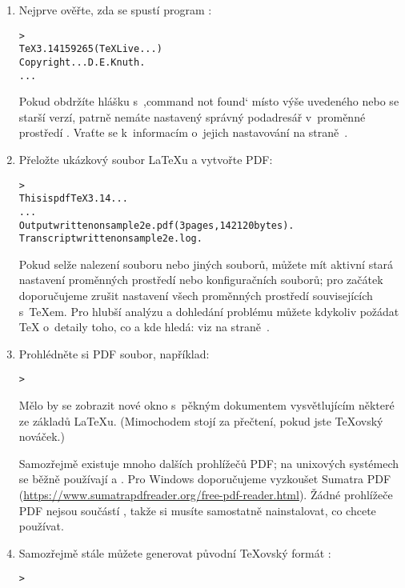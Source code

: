 \documentclass[\classoptions,slovak,english,czech]{\classname}
\newcommand{\singleuv}[1]{,#1`}
\begin{document}
\begin{enumerate}
\item Nejprve ověřte, zda se spustí program :

\begin{alltt}
> 
TeX 3.14159265 (TeX Live ...)
Copyright ... D.E. Knuth.
...
\end{alltt}
Pokud obdržíte hlášku s~\singleuv{command not found} místo výše 
uvedeného nebo se starší verzí, patrně nemáte nastavený správný podadresář
 v~proměnné prostředí .  Vraťte se
k~informacím o~jejich nastavování na straně~\pageref{sec:env}.

\item Přeložte ukázkový soubor \LaTeX{}u a vytvořte PDF:
\begin{alltt}
> 
This is pdfTeX 3.14...
...
Output written on sample2e.pdf (3 pages, 142120 bytes).
Transcript written on sample2e.log.
\end{alltt}
Pokud selže nalezení souboru  nebo jiných
souborů, můžete mít aktivní stará nastavení proměnných prostředí nebo
konfiguračních souborů; pro začátek doporučujeme zrušit 
nastavení všech proměnných prostředí souvisejících s~\TeX{}em.
Pro hlubší analýzu a dohledání problému můžete kdykoliv požádat
\TeX{} o~detaily toho, co a kde hledá: viz 
na straně~\pageref{sec:debugging}.

\item Prohlédněte si PDF soubor, například:
\begin{alltt}
	> 
\end{alltt}
Mělo by se zobrazit nové okno s~pěkným dokumentem vysvětlujícím některé ze
základů \LaTeX{}u. (Mimochodem stojí za přečtení, pokud jste \TeX{}ovský nováček.)

Samozřejmě existuje mnoho dalších prohlížečů PDF; na unixových systémech se běžně používají
 a . Pro Windows doporučujeme vyzkoušet Sumatra PDF
(\url{https://www.sumatrapdfreader.org/free-pdf-reader.html}). Žádné prohlížeče PDF nejsou součástí \TL{}, takže si musíte samostatně nainstalovat, co chcete
používat.

\item Samozřejmě stále můžete generovat původní \TeX{}ovský formát \dvi{}:
\begin{alltt}
> 
\end{alltt}


\end{enumerate}
\end{document}
